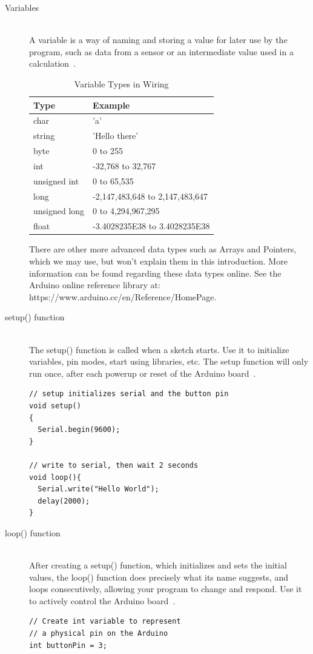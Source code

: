 \begin{description}
	\item[Variables] \hfill \\
	A variable is a way of naming and storing a value for later use by the program, such as data from a sensor or an intermediate value used in a calculation~\citep{arduino-15-b}.
	\begin{table}
		\centering
		\begin{tabular}{p{4cm} l}
			\toprule
			Type & Example\\ \midrule
			char & 'a' \\
			string & 'Hello there' \\
			byte & 0 to 255 \\
			int & -32,768 to 32,767 \\
			unsigned int & 0 to 65,535 \\
			long & -2,147,483,648 to 2,147,483,647 \\
			unsigned long & 0 to 4,294,967,295 \\
			float & -3.4028235E38 to 3.4028235E38 \\
			\bottomrule
		\end{tabular}
		\caption{Variable Types in Wiring}
		\label{tab:wiring_variable_types}
	\end{table}
	There are other more advanced data types such as Arrays and Pointers, which we may use, but won't explain them in this introduction. More information can be found regarding these data types online. See the Arduino online reference library at: https://www.arduino.cc/en/Reference/HomePage.
	
	\item[setup() function] \hfill \\
	The setup() function is called when a sketch starts. Use it to initialize variables, pin modes, start using libraries, etc. The setup function will only run once, after each powerup or reset of the Arduino board~\citep{arduino-15-c}.
	\begin{lstlisting}
// setup initializes serial and the button pin
void setup()
{
  Serial.begin(9600);
}

// write to serial, then wait 2 seconds
void loop(){
  Serial.write("Hello World");
  delay(2000);
}
	\end{lstlisting}

\newpage	
	\item[loop() function] \hfill \\
	After creating a setup() function, which initializes and sets the initial values, the loop() function does precisely what its name suggests, and loops consecutively, allowing your program to change and respond. Use it to actively control the Arduino board~\citep{arduino-15-d}.
	\begin{lstlisting}
// Create int variable to represent
// a physical pin on the Arduino
int buttonPin = 3;


\end{lstlisting}
\end{description}
